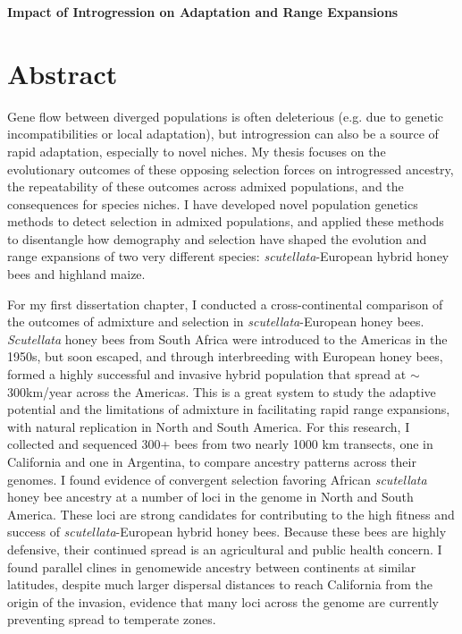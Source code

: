 \begin{center}
   \textbf{Impact of Introgression on Adaptation and Range Expansions} \\
\end{center}

\section*{Abstract}

	Gene flow between diverged populations is often deleterious (e.g. due to genetic incompatibilities or local adaptation),
	but introgression can also be a source of rapid adaptation, especially to novel niches.
	My thesis focuses on the evolutionary outcomes of these opposing selection forces on introgressed ancestry,
	the repeatability of these outcomes across admixed populations,
	and the consequences for species niches.
	I have developed novel population genetics methods to detect selection in admixed populations,
	and applied these methods to disentangle how demography and selection have shaped the evolution
	and range expansions of two very different species: \textit{scutellata}-European hybrid honey bees and highland maize.
	
	For my first dissertation chapter, I conducted a cross-continental comparison of the outcomes of admixture and selection in \textit{scutellata}-European honey bees.
	\textit{Scutellata} honey bees from South Africa were introduced to the Americas in the 1950s, but soon escaped, and through interbreeding with European honey bees,
	formed a highly successful and invasive hybrid population that spread at $\sim$300km/year across the Americas.
	This is a great system to study the adaptive potential and the limitations of admixture in facilitating rapid range expansions,
	with natural replication in North and South America.
	For this research, I collected and sequenced 300+ bees from two nearly 1000 km transects,
	one in California and one in Argentina, to compare ancestry patterns across their genomes.
	I found evidence of convergent selection favoring African \textit{scutellata} honey bee ancestry at a number of loci in the genome in North and South America.
	These loci are strong candidates for contributing to the high fitness and success of \textit{scutellata}-European hybrid honey bees.
	Because these bees are highly defensive, their continued spread is an agricultural and public health concern.
	I found parallel clines in genomewide ancestry between continents at similar latitudes,
	despite much larger dispersal distances to reach California from the origin of the invasion,
	evidence that many loci across the genome are currently preventing spread to temperate zones.
	
